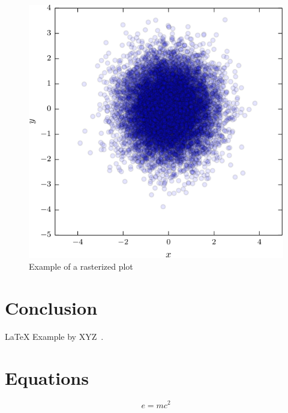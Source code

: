 \begin{multicols}{2}
\begin{figure}[H]
	\centering
	\includegraphics[width=0.9\columnwidth]{assets/figure_rasterized.pdf}
	\caption{Example of a rasterized plot}
\end{figure}

\lipsum[6] %

\section{Conclusion}\label{sec:conclusion}

\lipsum[7] %
\LaTeX{} Example by XYZ~\cite{doe2006test}.

\section{Equations}\label{sec:eq}
\begin{equation}
	\label{eq:emc}
	e = mc^2
\end{equation}



\printbibliography



\end{multicols}

